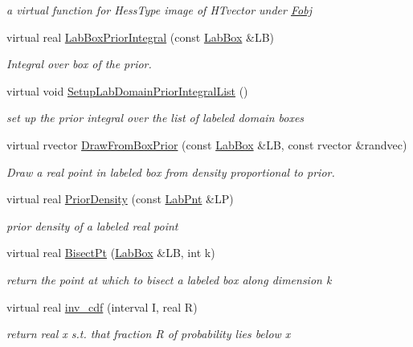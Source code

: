 \begin{DoxyCompactItemize}
\begin{DoxyCompactList}\small\item\em a virtual function for \-Hess\-Type image of \-H\-Tvector under \hyperlink{classFobj}{\-Fobj} \end{DoxyCompactList}\item 
virtual real \hyperlink{classFobj_aa44c68d5c5ea0330b428d0fae8aa1bdf}{\-Lab\-Box\-Prior\-Integral} (const \hyperlink{classLabBox}{\-Lab\-Box} \&\-L\-B)
\begin{DoxyCompactList}\small\item\em \-Integral over box of the prior. \end{DoxyCompactList}\item 
virtual void \hyperlink{classFobj_a8e3160c380ff77e60fd90c9d5f608fd1}{\-Setup\-Lab\-Domain\-Prior\-Integral\-List} ()
\begin{DoxyCompactList}\small\item\em set up the prior integral over the list of labeled domain boxes \end{DoxyCompactList}\item 
virtual rvector \hyperlink{classFobj_a96f576383f9061e630341cb0121603b0}{\-Draw\-From\-Box\-Prior} (const \hyperlink{classLabBox}{\-Lab\-Box} \&\-L\-B, const rvector \&randvec)
\begin{DoxyCompactList}\small\item\em \-Draw a real point in labeled box from density proportional to prior. \end{DoxyCompactList}\item 
virtual real \hyperlink{classFobj_a4a18a9cfa5c9e6d3e101cb95c83d3f7b}{\-Prior\-Density} (const \hyperlink{classLabPnt}{\-Lab\-Pnt} \&\-L\-P)
\begin{DoxyCompactList}\small\item\em prior density of a labeled real point \end{DoxyCompactList}\item 
virtual real \hyperlink{classFobj_a1bef464bc98d6047f7e2b112d1ea25a3}{\-Bisect\-Pt} (\hyperlink{classLabBox}{\-Lab\-Box} \&\-L\-B, int k)
\begin{DoxyCompactList}\small\item\em return the point at which to bisect a labeled box along dimension k \end{DoxyCompactList}\item 
virtual real \hyperlink{classFobj_adfdb53846db8ec3b667b9ffe09ad10db}{inv\-\_\-cdf} (interval \-I, real \-R)
\begin{DoxyCompactList}\small\item\em return real x s.\-t. that fraction \-R of probability lies below x \end{DoxyCompactList}\item 

\end{DoxyCompactItemize}
